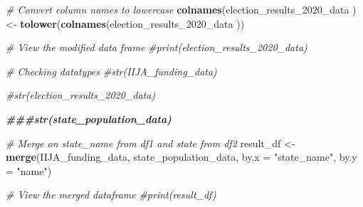 \documentclass[
]{article}
\newenvironment{Shaded}{\begin{snugshade}}{\end{snugshade}}
\newcommand{\AttributeTok}[1]{\textcolor[rgb]{0.13,0.29,0.53}{#1}}
\newcommand{\CommentTok}[1]{\textcolor[rgb]{0.56,0.35,0.01}{\textit{#1}}}
\newcommand{\DocumentationTok}[1]{\textcolor[rgb]{0.56,0.35,0.01}{\textbf{\textit{#1}}}}
\newcommand{\FunctionTok}[1]{\textcolor[rgb]{0.13,0.29,0.53}{\textbf{#1}}}
\newcommand{\NormalTok}[1]{#1}
\newcommand{\OtherTok}[1]{\textcolor[rgb]{0.56,0.35,0.01}{#1}}
\newcommand{\SpecialCharTok}[1]{\textcolor[rgb]{0.81,0.36,0.00}{\textbf{#1}}}
\newcommand{\StringTok}[1]{\textcolor[rgb]{0.31,0.60,0.02}{#1}}
\begin{document}
\begin{Shaded}
\begin{Highlighting}[]
\CommentTok{\# Convert column names to lowercase}
\FunctionTok{colnames}\NormalTok{(election\_results\_2020\_data ) }\OtherTok{\textless{}{-}} \FunctionTok{tolower}\NormalTok{(}\FunctionTok{colnames}\NormalTok{(election\_results\_2020\_data ))}

\CommentTok{\# View the modified data frame}
\CommentTok{\#print(election\_results\_2020\_data)}
\end{Highlighting}
\end{Shaded}

\begin{Shaded}
\end{Shaded}

\begin{Shaded}
\begin{Highlighting}[]
\CommentTok{\# Checking datatypes}
\CommentTok{\#str(IIJA\_funding\_data)}

\CommentTok{\#str(election\_results\_2020\_data)}

\DocumentationTok{\#\#\#str(state\_population\_data)}
\end{Highlighting}
\end{Shaded}

\begin{Shaded}
\end{Shaded}

\begin{Shaded}
\begin{Highlighting}[]
\CommentTok{\# Merge on \textquotesingle{}state\_name\textquotesingle{} from df1 and \textquotesingle{}state\textquotesingle{} from df2}
\NormalTok{result\_df }\OtherTok{\textless{}{-}} \FunctionTok{merge}\NormalTok{(IIJA\_funding\_data, state\_population\_data, }\AttributeTok{by.x =} \StringTok{"state\_name"}\NormalTok{, }\AttributeTok{by.y =} \StringTok{"name"}\NormalTok{)}

\CommentTok{\# View the merged dataframe}
\CommentTok{\#print(result\_df)}
\end{Highlighting}
\end{Shaded}
\end{document}
